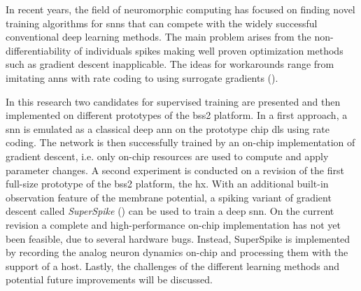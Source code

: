 In recent years, the field of neuromorphic computing has focused on finding novel training algorithms for \glspl{snn} that can compete with the widely successful conventional deep learning methods. The main problem arises from the non-differentiability of individuals spikes making well proven optimization methods such as gradient descent inapplicable. The ideas for workarounds range from imitating \glspl{ann} with rate coding to using surrogate gradients (\citealp{tavanaei2019deep}).

In this research two candidates for supervised training are presented and then implemented on different prototypes of the \gls{bss2} platform. In a first approach, a \gls{snn} is emulated as a classical deep \gls{ann} on the prototype chip \acrshort{dls} using rate coding. The network is then successfully trained by an on-chip implementation of gradient descent, i.e. only on-chip resources are used to compute and apply parameter changes. A second experiment is conducted on a revision of the first full-size prototype of the \gls{bss2} platform, the \acrshort{hx}. With an additional built-in observation feature of the membrane potential, a spiking variant of gradient descent called \emph{SuperSpike} (\citealp{zenke2018superspike}) can be used to train a deep \gls{snn}. On the current revision a complete and high-performance on-chip implementation has not yet been feasible, due to several hardware bugs. Instead, SuperSpike is implemented by recording the analog neuron dynamics on-chip and processing them with the support of a host. Lastly, the challenges of the different learning methods and potential future improvements will be discussed.\\